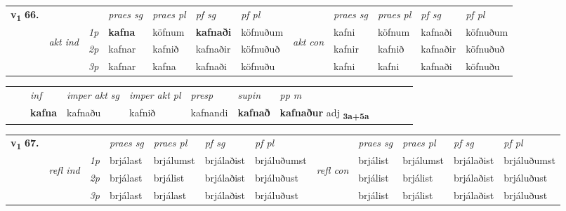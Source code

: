 \begin{tabular}{llllllllllll} \toprule
\multirow{4}{*}{{{\textbf{v{\textsubscript{1}}} \Large{\textbf{66.}}}}}  & &   &  \textit{praes sg}  & \textit{praes pl}  &\textit{ pf sg} & \textit{pf pl} &  &  \textit{praes sg}  & \textit{praes pl}  & \textit{pf sg} & \textit{pf pl } \\*
	\cmidrule{4-7} \cmidrule{9-12}
 & \multirow{3}{*}{\begin{turn}{90}\textit{akt ind}\end{turn}} & {\textit{1p}} & \textbf{kafna} & köfnum    & \textbf{kafnaði} & köfnuðum & \multirow{3}{*}{\begin{turn}{90}\textit{akt con}\end{turn}} &kafni & köfnum & kafnaði & köfnuðum\\*
& &  {\textit{2p}} &  kafnar  & kafnið   & kafnaðir & köfnuðuð & & kafnir & kafnið & kafnaðir & köfnuðuð \\*
& &  {\textit{3p}} & kafnar & kafna   & kafnaði & köfnuðu & & kafni & kafni& kafnaði & köfnuðu  \\*
\cmidrule{4-7} \cmidrule{9-12}
\end{tabular}


\begin{tabular}{llllllllllll}
 & & \textit{inf} & \textit{imper akt sg} & \textit{imper akt pl}   & \textit{presp} & \textit{supin}  & \textit{pp m}     \\*
  & & \textbf{kafna} & kafnaðu  & kafnið   & kafnandi &  \textbf{kafnað}  & \textbf{kafnaður} adj \textbf{\textsubscript{3a+5a}} \\*
\cmidrule{1-12}
\end{tabular}



\begin{tabular}{llllllllllll} \toprule
\multirow{4}{*}{{{\textbf{v{\textsubscript{1}}} \Large{\textbf{67.}}}}}  & &   &  \textit{praes sg}  & \textit{praes pl}  &\textit{pf sg} & \textit{pf pl} &  &  \textit{praes sg}  & \textit{praes pl}  & \textit{pf sg} & \textit{pf pl } \\*
	\cmidrule{4-7} \cmidrule{9-12}
 &\multirow{3}{*}{\begin{turn}{90}\textit{refl ind}\end{turn}} & {\textit{1p}} & brjálast & brjálumst    & brjálaðist & brjáluðumst & \multirow{3}{*}{\begin{turn}{90}\textit{refl con}\end{turn}}  &brjálist & brjálumst & brjálaðist & brjáluðumst\\*
 &&  {\textit{2p}} &  brjálast  & brjálist   & brjálaðist & brjáluðust & &brjálist & brjálist & brjálaðist & brjáluðust \\*
& &  {\textit{3p}} & brjálast & brjálast   & brjálaðist & brjáluðust & & brjálist & brjálist& brjálaðist & brjáluðust  \\*
\cmidrule{4-7} \cmidrule{9-12}
\end{tabular}


